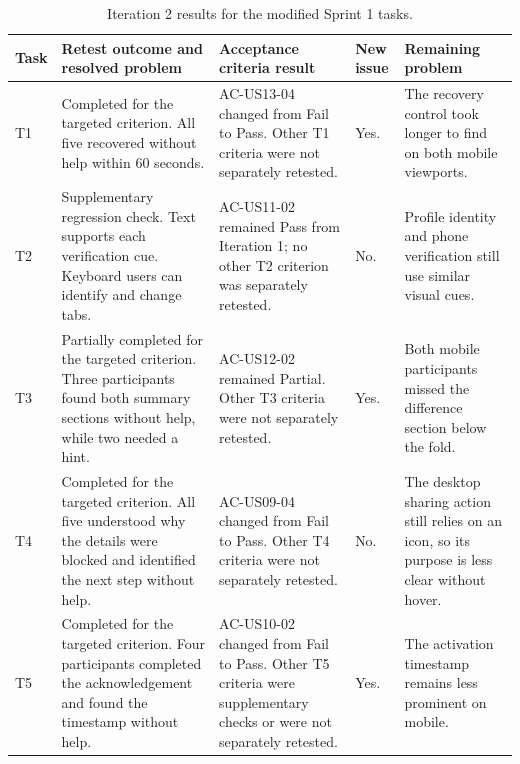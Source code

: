 \documentclass[11pt,a4paper]{article}
\begin{document}
\begin{table}[H]
    \centering
    \footnotesize
    \caption{Iteration 2 results for the modified Sprint 1 tasks.}
    \label{tabiterationtworesults}
    \begin{tabularx}{\textwidth}{@{}L{0.7cm}L{3.8cm}L{3.0cm}L{1.2cm}Y@{}}
    \toprule
    Task & Retest outcome and resolved problem & Acceptance criteria result & New issue & Remaining problem\\
    \midrule

    T1 &
    Completed for the targeted criterion. All five recovered without help
    within 60 seconds. &
    AC-US13-04 changed from Fail to Pass. Other T1 criteria were not separately
    retested. &
    Yes. &
    The recovery control took longer to find on both mobile viewports.\\

    T2 &
    Supplementary regression check. Text supports each verification cue.
    Keyboard users can identify and change tabs. &
    AC-US11-02 remained Pass from Iteration 1; no other T2 criterion was
    separately retested. &
    No. &
    Profile identity and phone verification still use similar visual cues.\\

    T3 &
    Partially completed for the targeted criterion. Three participants found
    both summary sections without help, while two needed a hint. &
    AC-US12-02 remained Partial. Other T3 criteria were not separately
    retested. &
    Yes. &
    Both mobile participants missed the difference section below the fold.\\

    T4 &
    Completed for the targeted criterion. All five understood why the details
    were blocked and identified the next step without help. &
    AC-US09-04 changed from Fail to Pass. Other T4 criteria were not separately
    retested. &
    No. &
    The desktop sharing action still relies on an icon, so its purpose is less
    clear without hover.\\

    T5 &
    Completed for the targeted criterion. Four participants completed the
    acknowledgement and found the timestamp without help. &
    AC-US10-02 changed from Fail to Pass. Other T5 criteria were supplementary
    checks or were not separately retested. &
    Yes. &
    The activation timestamp remains less prominent on mobile.\\
    \bottomrule
    \end{tabularx}
\end{table}
\end{document}
